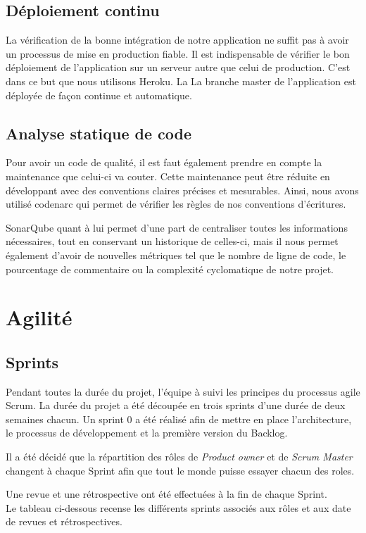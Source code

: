 \documentclass[12pt,a4paper,oneside]{book}
\begin{document}
	\section{Déploiement continu}
	La vérification de la bonne intégration de notre application ne suffit pas à avoir un processus de mise en production fiable. Il est indispensable de vérifier le bon déploiement de l'application sur un serveur autre que celui de production. C'est dans ce but que nous utilisons Heroku. La La branche master de l'application est déployée de façon continue et automatique.
	
	\section{Analyse statique de code}
	Pour avoir un code de qualité, il est faut également prendre en compte la maintenance que celui-ci va couter. Cette maintenance peut être réduite en développant avec des conventions claires précises et mesurables. 
	Ainsi, nous avons utilisé codenarc qui permet de vérifier les règles de nos conventions d’écritures. 
	
	SonarQube quant à lui permet d’une part de centraliser toutes les informations nécessaires, tout en conservant un historique de celles-ci, mais il nous permet également d’avoir de nouvelles métriques tel que le nombre de ligne de code, le pourcentage de commentaire ou la complexité cyclomatique de notre projet. 
	
	\chapter{Agilité}
	\section{Sprints}	
	Pendant toutes la durée du projet, l’équipe à suivi les principes du processus agile Scrum. La durée du projet a été découpée en trois sprints d’une durée de deux semaines chacun. Un sprint 0 a été réalisé afin de mettre en place l’architecture, le processus de développement et la première version du Backlog.
	
	Il a été décidé que la répartition des rôles de \textit{Product owner }et de \textit{Scrum Master }changent à chaque Sprint afin que tout le monde puisse essayer chacun des roles.
	
	Une revue et une rétrospective ont été effectuées à la fin de chaque Sprint.\\
	Le tableau ci-dessous recense les différents sprints associés aux rôles et aux date de revues et rétrospectives.
\end{document}
